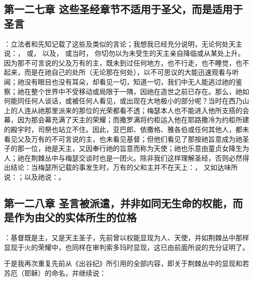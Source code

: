 
\subsection{第一二七章 这些圣经章节不适用于圣父，而是适用于圣言}

：立法者和先知记载了这些及类似的言论；我想我已经充分说明，无论何处天主说：， 或， 以及， 或当时， 你切勿以为未受生的天主亲自降临或从某处上升。因为那不可言说的父及万有的主，既未到过任何地方，也不行走，也不睡觉，也不起来，而是在祂自己的处所（无论那在何处），以不可思议的大能迅速观看与听闻；祂没有眼目也没有耳朵，却看见一切，知道一切，我们中无人能逃过祂的鉴察；祂在整个世界中不受移动或局限于一隅，因祂在造世之前已存在。那么，祂如何能同任何人谈话，或被任何人看见，或出现在大地极小的部分呢？当时在西乃山上的人连从祂那里派来的那位的光荣都看不透；梅瑟本人也不能进入他所支搭的会幕，因为那会幕充满了天主的荣耀；而撒罗满将约柜运入他在耶路撒冷为约柜所建的殿宇时，司祭也站立不住。因此，亚巴郎、依撒格、雅各伯或任何其他人，都未看见父及万有的不可言说的主，也未看见基督；但他们看见了那按祂旨意成为祂圣子的那一位，祂是天主，又因奉行祂的旨意而称为天使；祂也乐意由童贞女降生为人；祂在荆棘丛中与梅瑟交谈时也是一团火。除非我们这样理解圣经，否则必然得出结论：当梅瑟所记载的事发生时，万有的父和主并不在天上：， 又如达味所说：；以及祂说：。\par


\subsection{第一二八章 圣言被派遣，并非如同无生命的权能，而是作为由父的实体所生的位格}

：基督既是主，又是天主圣子，先前曾以权能显现为人、天使，并如荆棘丛中那样显现于火的荣耀中，也同样在审判索多玛时显现，这已由前面所说的充分证明了。\par

于是我再次重复先前从《出谷纪》所引用的全部内容，即关于荆棘丛中的显现和若苏厄（耶稣）的命名，并继续说：\par

